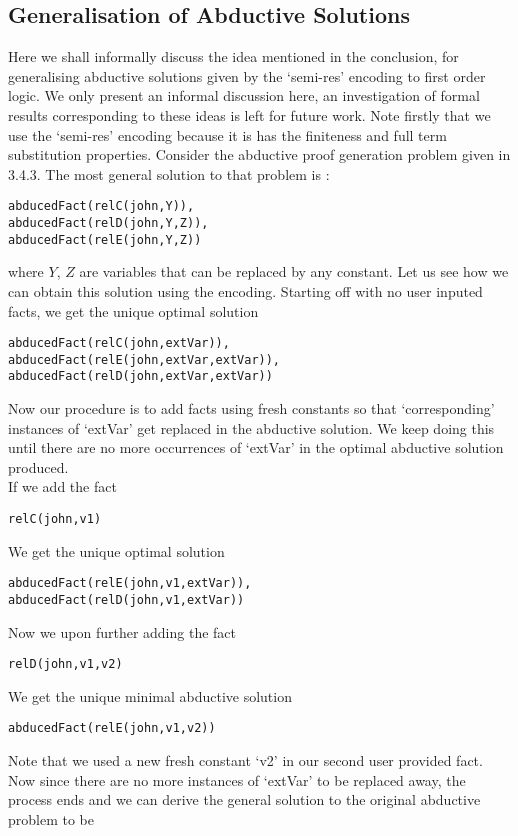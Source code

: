 \subsection{Generalisation of Abductive Solutions}\label{sec:generalisation_sol}
Here we shall informally discuss the idea mentioned in the conclusion, for generalising abductive solutions given by the ‘semi-res’ encoding to first order logic. We only present an informal discussion here, an investigation of formal results corresponding to these ideas is left for future work. Note firstly that we use the ‘semi-res’ encoding because it is has the finiteness and full term substitution properties. Consider the abductive proof generation problem given in 3.4.3. The most general solution to that problem is : \begin{lstlisting}[frame = none] 
abducedFact(relC(john,Y)), 
abducedFact(relD(john,Y,Z)), 
abducedFact(relE(john,Y,Z))
\end{lstlisting}
where $Y$, $Z$ are variables that can be replaced by any constant. Let us see how we can obtain this solution using the encoding. Starting off with no user inputed facts, we get the unique optimal solution
\begin{lstlisting}[frame = none]
abducedFact(relC(john,extVar)), 
abducedFact(relE(john,extVar,extVar)),
abducedFact(relD(john,extVar,extVar))
\end{lstlisting}
Now our procedure is to add facts using fresh constants so that ‘corresponding’ instances of ‘extVar’ get replaced in the abductive solution. We keep doing this until there are no more occurrences of ‘extVar’ in the optimal abductive solution produced.\\ If we add the fact 
\begin{lstlisting}[frame = none]
relC(john,v1)
\end{lstlisting}
We get the unique optimal solution 
\begin{lstlisting}[frame = none]
abducedFact(relE(john,v1,extVar)),
abducedFact(relD(john,v1,extVar))
\end{lstlisting}
Now we upon further adding the fact 
\begin{lstlisting}[frame = none]
relD(john,v1,v2)
\end{lstlisting}
We get the unique minimal abductive solution 
\begin{lstlisting}[frame = none]
abducedFact(relE(john,v1,v2))
\end{lstlisting}
Note that we used a new fresh constant ‘v2’ in our second user provided fact.
Now since there are no more instances of ‘extVar’ to be replaced away, the process ends and we can derive the general solution to the original abductive problem to be 
